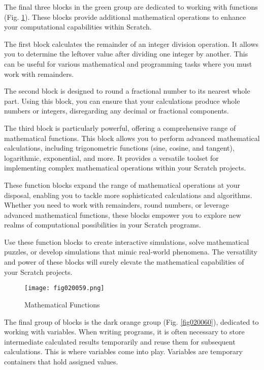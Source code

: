 The final three blocks in the green group are dedicated to working with functions (Fig. \ref{fig020059}). These blocks provide additional mathematical operations to enhance your computational capabilities within Scratch.

The first block calculates the remainder of an integer division operation. It allows you to determine the leftover value after dividing one integer by another. This can be useful for various mathematical and programming tasks where you must work with remainders.

The second block is designed to round a fractional number to its nearest whole part. Using this block, you can ensure that your calculations produce whole numbers or integers, disregarding any decimal or fractional components.

The third block is particularly powerful, offering a comprehensive range of mathematical functions. This block allows you to perform advanced mathematical calculations, including trigonometric functions (sine, cosine, and tangent), logarithmic, exponential, and more. It provides a versatile toolset for implementing complex mathematical operations within your Scratch projects.

These function blocks expand the range of mathematical operations at your disposal, enabling you to tackle more sophisticated calculations and algorithms. Whether you need to work with remainders, round numbers, or leverage advanced mathematical functions, these blocks empower you to explore new realms of computational possibilities in your Scratch programs.

Use these function blocks to create interactive simulations, solve mathematical puzzles, or develop simulations that mimic real-world phenomena. The versatility and power of these blocks will surely elevate the mathematical capabilities of your Scratch projects.

\begin{figure}[H]
   \centering
   \texttt{[image: fig020059.png]}
   \caption{Mathematical Functions}
\label{fig020059}
\end{figure}

The final group of blocks is the dark orange group (Fig. \ref{fig020060}), dedicated to working with variables. When writing programs, it is often necessary to store intermediate calculated results temporarily and reuse them for subsequent calculations. This is where variables come into play. Variables are temporary containers that hold assigned values.

